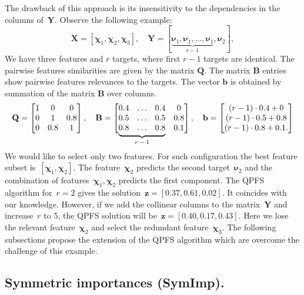 \documentclass[12pt,twoside]{article}
\theoremstyle{definition}
\newcommand{\bz}{\mathbf{z}}
\newcommand{\bb}{\mathbf{b}}
\newcommand{\bY}{\mathbf{Y}}
\newcommand{\bX}{\mathbf{X}}
\newcommand{\bB}{\mathbf{B}}
\newcommand{\bQ}{\mathbf{Q}}
\newcommand{\bchi}{\boldsymbol{\chi}}
\newcommand{\bnu}{\boldsymbol{\nu}}
\newcommand\undermat[2]{%
	\makebox[0pt][l]{$\smash{\underbrace{\phantom{%
					\begin{matrix}#2\end{matrix}}}_{\text{$#1$}}}$}#2}
\begin{document}
The drawback of this approach is its insensitivity to the dependencies in the columns of~$\bY$. Observe the following example:
\begin{equation*}
\bX = [\bchi_1, \bchi_2, \bchi_3], \quad \bY = [\underbrace{\bnu_1, \bnu_1, \dots, \bnu_1}_{r-1}, \bnu_2],
\end{equation*}
We have three features and $r$ targets, where first $r-1$ targets are identical.
The pairwise features similarities are given by the matrix $\bQ$.
The matrix $\bB$ entries show pairwise features relevances to the targets.
The vector $\bb$ is obtained by summation of the matrix $\bB$ over columns.
\begin{equation}
\bQ = \begin{bmatrix} 1 & 0 & 0\\ 0 & 1 & 0.8 \\ 0 & 0.8 & 1 \end{bmatrix}, \quad
\bB = \begin{bmatrix} 0.4 & \dots & 0.4 & 0 \\ 0.5 & \dots & 0.5 & 0.8 \\ \undermat{r-1}{0.8 & \dots & 0.8} & 0.1 \end{bmatrix}, \quad
\bb = \begin{bmatrix} (r-1) \cdot 0.4 + 0 \\ (r-1) \cdot 0.5 + 0.8 \\ (r-1) \cdot 0.8 + 0.1. \end{bmatrix}
\label{eq:qpfs_example}
\end{equation}
\vspace{0.5cm} \\
We would like to select only two features.
For such configuration the best feature subset is~$[\bchi_1, \bchi_2]$.
The feature~$\bchi_2$ predicts the second target~$\bnu_2$ and the combination of features~$\bchi_1, \bchi_2$ predicts the first component.
The QPFS algorithm for~$r=2$ gives the solution~$\bz = [0.37,	0.61,	0.02]$. It coincides with our knowledge.
However, if we add the collinear columns to the matrix~$\bY$ and increase~$r$ to 5, the QPFS solution will be~$\bz = [0.40,	0.17, 0.43]$.
Here we lose the relevant feature~$\bchi_2$ and select the redundant feature~$\bchi_3$.
The following subsections propose the extension of the QPFS algorithm which are overcome the challenge of this example.

\subsection{Symmetric importances (SymImp).}
\end{document}
